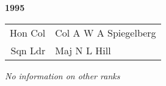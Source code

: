\begin{center}
  \Huge
  \textbf{1995}
\end{center}

\begin{center}
  \small
  \begin{tabular}{rl}
    Hon Col & Col A W A Spiegelberg \\
    Sqn Ldr & Maj N L Hill \\
  \end{tabular}
\end{center}

\begin{center}
  \textit{No information on other ranks}
\end{center}

\vspace{50mm}

\pagebreak
